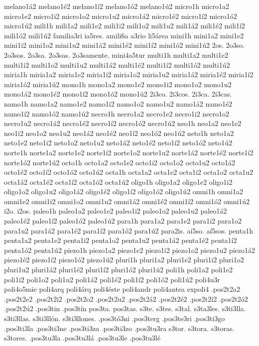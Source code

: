 {melano1á2 melano1é2 melano1í2 melano1ó2 melano1ú2
micro1h
micro1a2 micro1e2 micro1i2 micro1o2 micro1u2
micro1á2 micro1é2 micro1í2 micro1ó2 micro1ú2
mili1h
mili1a2 mili1e2 mili1i2 mili1o2 mili1u2
mili1á2 mili1é2 mili1í2 mili1ó2 mili1ú2
familia3ri
ia5res.
amili6a
a3rio
li5área
mini1h
mini1a2 mini1e2 mini1i2 mini1o2 mini1u2
mini1á2 mini1é2 mini1í2 mini1ó2 mini1ú2
2os.
2o3so.
2o3sos.
2o3sa.
2o3sas.
2o3samente.
mini4a5tur
multi1h
multi1a2 multi1e2 multi1i2 multi1o2 multi1u2
multi1á2 multi1é2 multi1í2 multi1ó2 multi1ú2
miria1h
miria1a2 miria1e2 miria1i2 miria1o2 miria1u2
miria1á2 miria1é2 miria1í2 miria1ó2 miria1ú2
mono1h
mono1a2 mono1e2 mono1i2 mono1o2 mono1u2
mono1á2 mono1é2 mono1í2 mono1ó2 mono1ú2
2i3co.
2i3cos.
2i3ca.
2i3cas.
namo1h
namo1a2 namo1e2 namo1i2 namo1o2 namo1u2
namo1á2 namo1é2 namo1í2 namo1ó2 namo1ú2
necro1h
necro1a2 necro1e2 necro1i2 necro1o2 necro1u2
necro1á2 necro1é2 necro1í2 necro1ó2 necro1ú2
neo1h
neo1a2 neo1e2 neo1i2 neo1o2 neo1u2
neo1á2 neo1é2 neo1í2 neo1ó2 neo1ú2
neto1h
neto1a2 neto1e2 neto1i2 neto1o2 neto1u2
neto1á2 neto1é2 neto1í2 neto1ó2 neto1ú2
norte1h
norte1a2 norte1e2 norte1i2 norte1o2 norte1u2
norte1á2 norte1é2 norte1í2 norte1ó2 norte1ú2
octo1h
octo1a2 octo1e2 octo1i2 octo1o2 octo1u2
octo1á2 octo1é2 octo1í2 octo1ó2 octo1ú2
octa1h
octa1a2 octa1e2 octa1i2 octa1o2 octa1u2
octa1á2 octa1é2 octa1í2 octa1ó2 octa1ú2
oligo1h
oligo1a2 oligo1e2 oligo1i2 oligo1o2 oligo1u2
oligo1á2 oligo1é2 oligo1í2 oligo1ó2 oligo1ú2
omni1h
omni1a2 omni1e2 omni1i2 omni1o2 omni1u2
omni1á2 omni1é2 omni1í2 omni1ó2 omni1ú2
i2o.
i2os.
paleo1h
paleo1a2 paleo1e2 paleo1i2 paleo1o2 paleo1u2
paleo1á2 paleo1é2 paleo1í2 paleo1ó2 paleo1ú2
para1h
para1a2 para1e2 para1i2 para1o2 para1u2
para1á2 para1é2 para1í2 para1ó2 para1ú2
para2is.
aí5so.
aí5sos.
penta1h
penta1a2 penta1e2 penta1i2 penta1o2 penta1u2
penta1á2 penta1é2 penta1í2 penta1ó2 penta1ú2
piezo1h
piezo1a2 piezo1e2 piezo1i2 piezo1o2 piezo1u2
piezo1á2 piezo1é2 piezo1í2 piezo1ó2 piezo1ú2
pluri1h
pluri1a2 pluri1e2 pluri1i2 pluri1o2 pluri1u2
pluri1á2 pluri1é2 pluri1í2 pluri1ó2 pluri1ú2
poli1h
poli1a2 poli1e2 poli1i2 poli1o2 poli1u2
poli1á2 poli1é2 poli1í2 poli1ó2 poli1ú2
poli4u3r
poli4o5mie
poli4arq
poli4árq
poli4éste
poli4andr
poli4antea
expoli4
.pos2t2a2
.pos2t2e2
.pos2t2i2
.pos2t2o2
.pos2t2u2
.pos2t2á2
.pos2t2é2
.pos2t2í2
.pos2t2ó2
.pos2t2ú2
.pos3tin
.pos3tín
pos3ta.
pos3tas.
s3te.
s3tes.
s3tal.
s3ta3les.
s3ti3lla.
s3ti3llas.
s3ti3llón.
s3ti3llones.
.pos3tó3ni
.pos3terg
.pos3te3ri
.pos3ti3go
.pos3ti3la
.pos3ti3ne
.pos3ti3za
.pos3ti3zo
.pos3tu3ra
s3tor.
s3tora.
s3toras.
s3tores.
.pos3tu3la
.pos3tu3lá
.pos3tu3le
.pos3tu3lé
}

